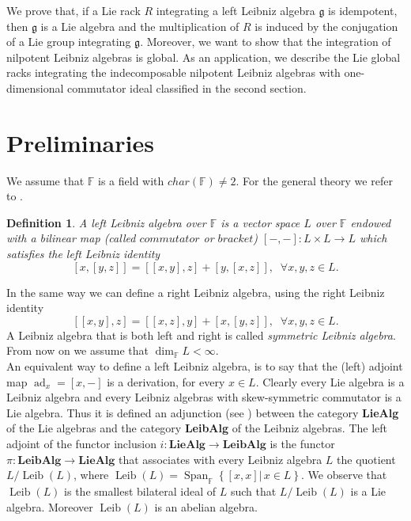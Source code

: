 \documentclass[english,4paper,10pt]{article}
\newcommand{\F}{\mathbb{F}}
\newcommand{\mg}{\mathfrak{g}}
\newtheorem{definition}[thm]{Definition}
\begin{document}
We prove that, if a Lie rack $R$ integrating a left Leibniz algebra $\mg$ is idempotent, then $\mg$ is a Lie algebra and the multiplication of $R$ is induced by the conjugation of a Lie group integrating $\mg$. Moreover, we want to show that the integration of nilpotent Leibniz algebras is global. As an application, we describe the Lie global racks integrating the indecomposable nilpotent Leibniz algebras with one-dimensional commutator ideal classified in the second section.

\section{Preliminaries}

We assume that $\F$ is a field with $char(\F)\neq2$. For the general theory we refer to \cite{ayupov2019leibniz}.

\begin{definition}
	A \emph{left Leibniz algebra} over $\mathbb{F}$ is a vector space $L$ over $\mathbb{F}$ endowed with a bilinear map (called $commutator$ or $bracket$) $\left[-,-\right]\colon L\times L \rightarrow L$ which satisfies the \emph{left Leibniz identity}
	$$
	\left[x,\left[y,z\right]\right]=\left[\left[x,y\right],z\right]+\left[y,\left[x,z\right]\right],\;\;\forall x,y,z\in L.
	$$
	
\end{definition}
	In the same way we can define a right Leibniz algebra, using the right Leibniz identity
	$$
	\left[\left[x,y\right],z\right]=\left[[x,z],y\right]+\left[x,\left[y,z\right]\right],\;\;\forall x,y,z\in L.
	$$
	A Leibniz algebra that is both left and right is called \emph{symmetric Leibniz algebra}. From now on we assume that $\dim_\F L<\infty$.\\
	
	 An equivalent way to define a left Leibniz algebra, is to say that the (left) adjoint map $\operatorname{ad}_x=\left[x,-\right]$ is a derivation, for every $x\in L$. Clearly every Lie algebra is a Leibniz algebra and every Leibniz algebras with skew-symmetric commutator is a Lie algebra. Thus it is defined an adjunction (see \cite{mac2013categories}) between the category \textbf{LieAlg} of the Lie algebras and the category \textbf{LeibAlg} of the Leibniz algebras. The left adjoint of the functor inclusion $i\colon\textbf{LieAlg}\rightarrow \textbf{LeibAlg}$ is the functor $\pi\colon\textbf{LeibAlg} \rightarrow \textbf{LieAlg}$ that associates with every Leibniz algebra $L$ the quotient $L/\operatorname{Leib}(L)$, where $\operatorname{Leib}(L)=\operatorname{Span}_\F\left\{\left[x,x\right] |\,x\in L\right\}$. We observe that $\operatorname{Leib}(L)$ is the smallest bilateral ideal of $L$ such that $L/\operatorname{Leib}(L)$ is a Lie algebra. Moreover $\operatorname{Leib}(L)$ is an abelian algebra.
	 
\end{document}

